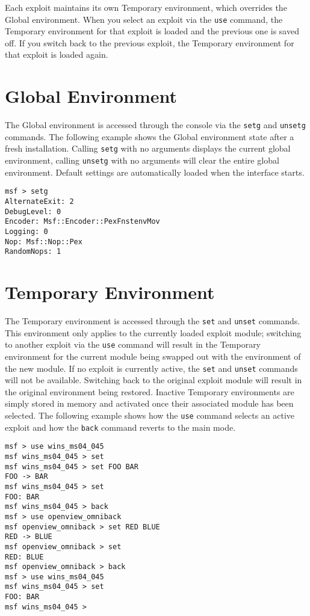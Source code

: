 \documentclass{report}
\begin{document}
\par
Each exploit maintains its own Temporary environment, which overrides the Global
environment. When you select an exploit via the \texttt{use} command, the
Temporary environment for that exploit is loaded and the previous one is saved
off. If you switch back to the previous exploit, the Temporary environment for
that exploit is loaded again.   

    \section{Global Environment}
    \label{ENV-GLOBAL}
\par
The Global environment is accessed through the console via the \texttt{setg} and
\texttt{unsetg} commands. The following example shows the Global environment
state after a fresh installation. Calling \texttt{setg} with no arguments
displays the current global environment, calling \texttt{unsetg} with no
arguments will clear the entire global environment. Default settings are
automatically loaded when the interface starts.


\begin{verbatim}
msf > setg
AlternateExit: 2
DebugLevel: 0
Encoder: Msf::Encoder::PexFnstenvMov
Logging: 0
Nop: Msf::Nop::Pex
RandomNops: 1
\end{verbatim}


    \section{Temporary Environment}
    \label{ENV-TEMP}
\par

The Temporary environment is accessed through the \texttt{set} and
\texttt{unset} commands. This environment only applies to the currently loaded
exploit module; switching to another exploit via the \texttt{use} command will
result in the Temporary environment for the current module being swapped out
with the environment of the new module. If no exploit is currently active, the
\texttt{set} and \texttt{unset} commands will not be available. Switching back
to the original exploit module will result in the original environment being
restored. Inactive Temporary environments are simply stored in memory and
activated once their associated module has been selected. The following example
shows how the \texttt{use} command selects an active exploit and how the
\texttt{back} command reverts to the main mode.  

\begin{verbatim}
msf > use wins_ms04_045
msf wins_ms04_045 > set
msf wins_ms04_045 > set FOO BAR
FOO -> BAR
msf wins_ms04_045 > set
FOO: BAR
msf wins_ms04_045 > back
msf > use openview_omniback
msf openview_omniback > set RED BLUE
RED -> BLUE
msf openview_omniback > set
RED: BLUE
msf openview_omniback > back
msf > use wins_ms04_045
msf wins_ms04_045 > set
FOO: BAR
msf wins_ms04_045 >
\end{verbatim}
\end{document}
